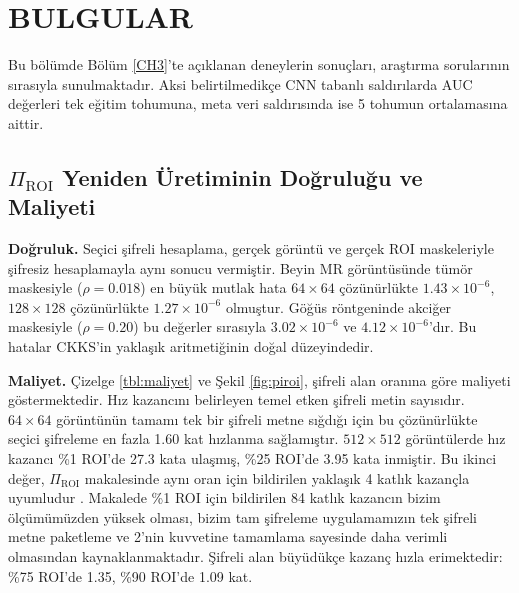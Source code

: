 \chapter{BULGULAR}\label{CH4}

Bu bölümde Bölüm \ref{CH3}'te açıklanan deneylerin sonuçları, araştırma sorularının sırasıyla sunulmaktadır. Aksi belirtilmedikçe CNN tabanlı saldırılarda AUC değerleri tek eğitim tohumuna, meta veri saldırısında ise 5 tohumun ortalamasına aittir.

\section{$\Pi_{\mathrm{ROI}}$ Yeniden Üretiminin Doğruluğu ve Maliyeti}\label{sec:res:piroi}

\textbf{Doğruluk.} Seçici şifreli hesaplama, gerçek görüntü ve gerçek ROI maskeleriyle şifresiz hesaplamayla aynı sonucu vermiştir. Beyin MR görüntüsünde tümör maskesiyle ($\rho = 0.018$) en büyük mutlak hata $64 \times 64$ çözünürlükte $1.43 \times 10^{-6}$, $128 \times 128$ çözünürlükte $1.27 \times 10^{-6}$ olmuştur. Göğüs röntgeninde akciğer maskesiyle ($\rho = 0.20$) bu değerler sırasıyla $3.02 \times 10^{-6}$ ve $4.12 \times 10^{-6}$'dır. Bu hatalar CKKS'in yaklaşık aritmetiğinin doğal düzeyindedir.

\textbf{Maliyet.} Çizelge \ref{tbl:maliyet} ve Şekil \ref{fig:piroi}, şifreli alan oranına göre maliyeti göstermektedir. Hız kazancını belirleyen temel etken şifreli metin sayısıdır. $64 \times 64$ görüntünün tamamı tek bir şifreli metne sığdığı için bu çözünürlükte seçici şifreleme en fazla 1.60 kat hızlanma sağlamıştır. $512 \times 512$ görüntülerde hız kazancı \%1 ROI'de 27.3 kata ulaşmış, \%25 ROI'de 3.95 kata inmiştir. Bu ikinci değer, $\Pi_{\mathrm{ROI}}$ makalesinde aynı oran için bildirilen yaklaşık 4 katlık kazançla uyumludur \cite{bakas2026roi}. Makalede \%1 ROI için bildirilen 84 katlık kazancın bizim ölçümümüzden yüksek olması, bizim tam şifreleme uygulamamızın tek şifreli metne paketleme ve 2'nin kuvvetine tamamlama sayesinde daha verimli olmasından kaynaklanmaktadır. Şifreli alan büyüdükçe kazanç hızla erimektedir: \%75 ROI'de 1.35, \%90 ROI'de 1.09 kat.

